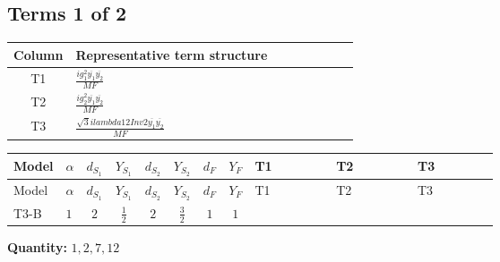 \documentclass[8pt]{article}
\begin{document}
\begin{landscape}
\subsection*{Terms 1 of 2}
\begin{center}
\begin{tabular}{@{}c >{\raggedright\arraybackslash}p{0.82\linewidth}@{}}
\toprule
Column & Representative term structure \\
\midrule
T1 & \(\displaystyle \frac{i g_{1}^{2} \overline{y_{1}} \overline{y_{2}}}{MF}\) \\
\midrule
T2 & \(\displaystyle \frac{i g_{2}^{2} \overline{y_{1}} \overline{y_{2}}}{MF}\) \\
\midrule
T3 & \(\displaystyle \frac{\sqrt{3} i lambda12Inv2 \overline{y_{1}} \overline{y_{2}}}{MF}\) \\
\midrule
\bottomrule
\end{tabular}
\end{center}
\smallskip
\tiny
\begin{longtable}{@{}llcccccc >{\raggedright\arraybackslash}p{0.21\linewidth} >{\raggedright\arraybackslash}p{0.21\linewidth} >{\raggedright\arraybackslash}p{0.21\linewidth}@{}}
\toprule
Model & $\alpha$ & $d_{S_1}$ & $Y_{S_1}$ & $d_{S_2}$ & $Y_{S_2}$ & $d_F$ & $Y_F$ & T1 & T2 & T3 \\
\midrule
\endfirsthead
\toprule
Model & $\alpha$ & $d_{S_1}$ & $Y_{S_1}$ & $d_{S_2}$ & $Y_{S_2}$ & $d_F$ & $Y_F$ & T1 & T2 & T3 \\
\midrule
\endhead
T3-B & $1$ & $2$ & $\frac{1}{2}$ & $2$ & $\frac{3}{2}$ & $1$ & $1$ & \scriptsize\adjustbox{max width=\linewidth}{$\begin{gathered} - \frac{3 i g_{1}^{2} \overline{y_{1}} \overline{y_{2}}}{4 MF}\end{gathered}$} & \scriptsize\adjustbox{max width=\linewidth}{$\begin{gathered} - \frac{3 i g_{2}^{2} \overline{y_{1}} \overline{y_{2}}}{8 MF}\end{gathered}$} & \scriptsize\adjustbox{max width=\linewidth}{$\begin{gathered} - \frac{\sqrt{3} i lambda12Inv2 \overline{y_{1}} \overline{y_{2}}}{6 MF}\end{gathered}$} \\
\midrule
\bottomrule
\end{longtable}
\clearpage
\noindent\textbf{Quantity: }$\mathrm{1,2,7,12}$\par\smallskip

\end{landscape}
\end{document}

